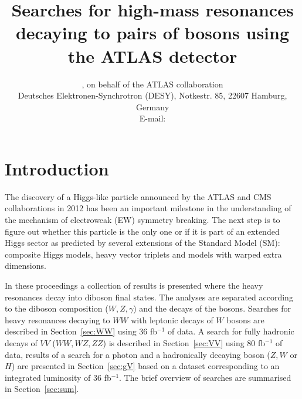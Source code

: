 \documentclass{PoS}
\title{Searches for high-mass resonances decaying to pairs of bosons using the ATLAS detector}
\author{\speaker{Kirill Grevtsov}, {on behalf of the ATLAS collaboration}\\%
        Deutsches Elektronen-Synchrotron (DESY), Notkestr. 85, 22607 Hamburg, Germany\\
        E-mail: \email{kirill.grevtsov@cern.ch}}
\begin{document}

\vspace*{-10mm}
\section{Introduction}
\vspace*{-2mm}
The discovery of a Higgs-like particle announced by the ATLAS and CMS collaborations in 2012 \cite{HIGG-2012-27,CMS-HIG-12-028} has been an important milestone in the understanding of the mechanism of electroweak (EW) symmetry breaking. %
The next step is to figure out whether this particle is the only one or if it is part of an extended Higgs sector as predicted by several extensions of the Standard Model (SM): composite Higgs models, heavy vector triplets and models with warped extra dimensions.


In these proceedings a collection of results is presented where the heavy resonances decay into diboson final states. 
The analyses are separated according to the diboson composition ($W,Z, \gamma$) and the decays of the bosons. 
Searches for heavy resonances decaying to $WW$ with leptonic decays of $W$ bosons are described in Section~\ref{sec:WW} using 36 fb$^{-1}$ of data.
A search for fully hadronic decays of $VV$ ($WW, WZ, ZZ$) is described in Section~\ref{sec:VV} using 80 fb$^{-1}$ of data, results of a search for a photon and a hadronically decaying boson ($Z,W$ or $H$) are presented in Section~\ref{sec:gV} based on a dataset corresponding to an integrated luminosity of 36 fb$^{-1}$. 
The brief overview of searches are summarised in Section~\ref{sec:sum}.
\end{document}
